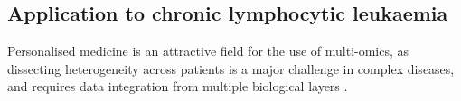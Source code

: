 



\subsection{Application to chronic lymphocytic leukaemia} \label{section:mofa_cll}
Personalised medicine is an attractive field for the use of multi-omics, as dissecting heterogeneity across patients is a major challenge in complex diseases, and requires data integration from multiple biological layers \cite{Chen2013,Costello2014,Alyass2015}.

